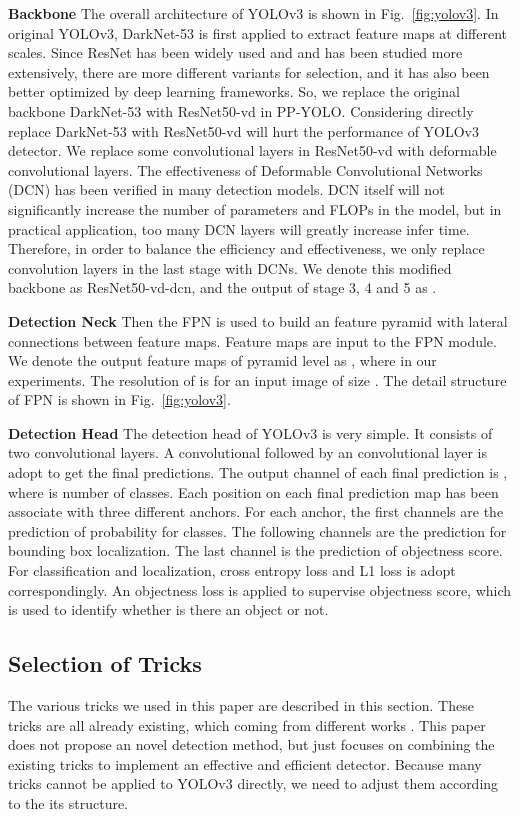 \documentclass[10pt,twocolumn,letterpaper]{article}
\newcommand{\pheadB}[1] {\vspace{1mm}\noindent\textbf{#1}}
\begin{document}
	\pheadB{Backbone} 
	The overall architecture of YOLOv3 is shown in Fig.~\ref{fig:yolov3}.
	In original YOLOv3\cite{yolov3}, DarkNet-53 is first applied to extract feature maps at different scales. Since ResNet\cite{resnet} has been widely used and and has been studied more extensively, there are more different variants for selection, and it has also been better optimized by deep learning frameworks.
	So, we replace the original backbone DarkNet-53 with ResNet50-vd in PP-YOLO. 
	Considering directly replace DarkNet-53 with ResNet50-vd will hurt the performance of YOLOv3 detector. We replace some convolutional layers in ResNet50-vd with deformable convolutional layers. The effectiveness of Deformable Convolutional Networks (DCN) has been verified in many detection models. DCN itself will not significantly increase the number of parameters and FLOPs in the model, but in practical application, too many DCN layers will greatly increase infer time. Therefore, in order to balance the efficiency and effectiveness, we only replace  convolution layers in the last stage with DCNs. We denote this modified backbone as ResNet50-vd-dcn, and the output of stage 3, 4 and 5 as .
	
	\pheadB{Detection Neck}
	Then the FPN \cite{fpn} is used to build an feature pyramid with lateral connections between feature maps. Feature maps  are  input to the FPN module. We denote the output feature maps of pyramid level  as , where   in our experiments. The resolution of  is  for an input image of size . The detail structure of FPN is shown in Fig.~\ref{fig:yolov3}.  
	
	\pheadB{Detection Head} 
	The detection head of YOLOv3 is very simple. It consists of two convolutional layers. A  convolutional followed by an  convolutional layer is adopt to get the final predictions. The output channel of each final prediction is , where  is number of classes. Each position on each final prediction map has been associate with three different anchors. For each anchor, the first  channels are the prediction of probability for  classes. The following  channels are the prediction for bounding box localization. The last channel is the prediction of objectness score. For classification and localization, cross entropy loss and L1 loss is adopt correspondingly. An objectness loss \cite{yolov3} is applied to supervise objectness score, which is used to identify whether is there an object or not. 
	
	\subsection{Selection of Tricks}  \label{sec:tricks}
	The various tricks we used in this paper are described in this section. These tricks are all already existing, which coming from different works \cite{dropblock,yolov4,iouloss,iouaware,solov2,coordconv,spp}. This paper does not propose an novel detection method, but just focuses on combining the existing tricks to implement an effective and efficient detector. Because many tricks cannot be applied to YOLOv3 directly, we need to adjust them according to the its structure.
	
\end{document}

